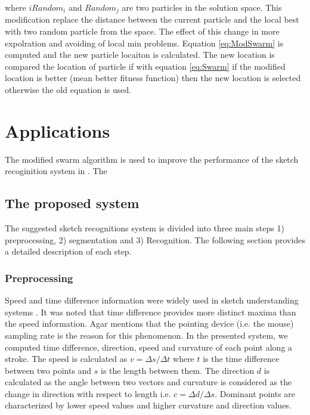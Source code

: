 \documentclass[10pt]{article}
\begin{document}
where $iRandom_i$ and $Random_j$ are two particles in the solution space. This modification replace the distance between the current particle and the local best with two random particle from the space. The effect of this change in more expolration and avoiding of local min problems. Equation \ref{eq:ModSwarm} is computed and the new particle locaiton is calculated. The new location is compared the location of particle if with equation \ref{eq:Swarm} if the modified location is better (mean better fitness function) then the new location is selected otherwise the old equation is used. 
\section{Applications }
The modified swarm algorithm is used to improve the performance of the sketch recoginition system in \cite{myPaper}. The 
\subsection{The proposed system}
\label{Sysdisc}
 The suggested sketch recognitions system is divided into three main steps 1) preprocessing, 2) segmentation and 3) Recognition. The following section provides a detailed description of each step.
\subsubsection{Preprocessing}
\label{Prepross}
 Speed and time difference information were widely used in sketch understanding systems \cite{earlyprocess}. It was noted that time difference provides more distinct maxima than the speed information. Agar \cite{polygonfeedback31} mentions that the pointing device (i.e. the mouse) sampling rate is the reason for this phenomenon. 
 In the presented system, we computed time difference, direction, speed and curvature of each point along a stroke. The speed is calculated as $v=\Delta s/\Delta t$ where $t$ is the time difference between two points and $s$ is the length between them. The direction $d$ is calculated as the angle between two vectors and curvature is considered as the change in direction with respect to length i.e. $c= \Delta d/\Delta s$. Dominant points are characterized by lower speed values and higher curvature and direction values.
  
\end{document}
